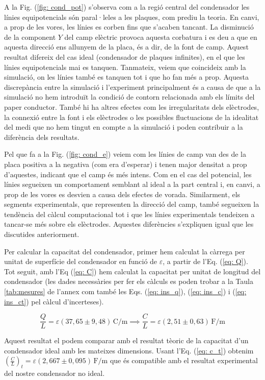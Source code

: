 \documentclass[11pt]{article}
\numberwithin{equation}{section}
\numberwithin{figure}{section}
\numberwithin{table}{section}
\begin{document}
A la Fig. (\ref{fig: cond_pot}) s'observa com a la regió central del condensador les línies equipotencials són paral·leles a les plaques, com prediu la teoria. En canvi, a prop de les vores, les línies es corben fins que s'acaben tancant. La disminució de la component $Y$ del camp elèctric provoca aquesta corbatura i es deu a que en aquesta direcció ens allunyem de la placa, és a dir, de la font de camp. Aquest resultat difereix del cas ideal (condensador de plaques infinites), en el que les línies equipotencials mai es tanquen. Tanmateix, veiem que coincideix amb la simulació, on les línies també es tanquen tot i que ho fan més a prop. Aquesta discrepància entre la simulació i l'experiment principalment és a causa de que a la simulació no hem introduït la condició de contorn relacionada amb els límits del paper conductor. També hi ha altres efectes com les irregularitats dels elèctrodes, la connexió entre la font i els elèctrodes o les possibles fluctuacions de la idealitat del medi que no hem tingut en compte a la simulació i poden contribuir a la diferència dels resultats.

Pel que fa a la Fig. (\ref{fig: cond_e}) veiem com les línies de camp van des de la placa positiva a la negativa (com era d'esperar) i tenen major densitat a prop d'aquestes, indicant que el camp és més intens. Com en el cas del potencial, les línies segueixen un comportament semblant al ideal a la part central i, en canvi, a prop de les vores es desvien a causa dels efectes de vorada. Similarment, els segments experimentals, que representen la direcció del camp, també segueixen la tendència del càlcul computacional tot i que les línies experimentals tendeixen a tancar-se més sobre els elèctrodes. Aquestes diferències s'expliquen igual que les discutides anteriorment.

Per calcular la capacitat del condensador, primer hem calculat la càrrega per unitat de superfície del condensador en funció de $\varepsilon$, a partir de l'Eq. (\ref{eq: Q}). Tot seguit, amb l'Eq (\ref{eq: C}) hem calculat la capacitat per unitat de longitud del condensador (les dades necessàries per fer els càlculs es poden trobar a la Taula \ref{tab:mesures} de l'annex com també les Eqs. (\ref{eq: ins_q}), (\ref{eq: ins_c}) i (\ref{eq: ins_ct}) pel càlcul d'incerteses).

\[
\frac{Q}{L} = \varepsilon  (37{,}65 \pm 9{,}48)\, \mathrm{C/m} \implies
\boxed{ \frac{C}{L} = \varepsilon  (2{,}51 \pm 0{,}63)\, \mathrm{F/m} }
\]    

Aquest resultat el podem comparar amb el resultat tèoric de la capacitat d'un condensador ideal amb les mateixes dimensions. Usant l'Eq. (\ref{eq: c_t}) obtenim $(\frac{C}{L})_t =\varepsilon(2,667 \pm 0,095)\, \mathrm{F/m}$ que és compatible amb el resultat experimental del nostre condensador no ideal.
\end{document}
